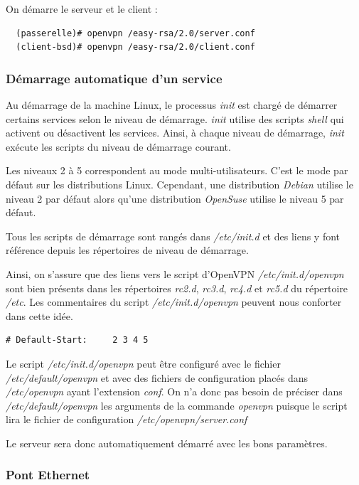 \documentclass[a4paper]{article}
\begin{document}
On démarre le serveur et le client :
\begin{verbatim}
  (passerelle)# openvpn /easy-rsa/2.0/server.conf
  (client-bsd)# openvpn /easy-rsa/2.0/client.conf
\end{verbatim}

\subsubsection{Démarrage automatique d'un service}

Au démarrage de la machine Linux, le processus \textit{init} 
est chargé de démarrer certains services selon le niveau de démarrage.
\textit{init} utilise des scripts \textit{shell} qui activent ou désactivent
les services. Ainsi, à chaque niveau de démarrage, \textit{init} exécute
les scripts du niveau de démarrage courant.

Les niveaux 2 à 5 correspondent au mode multi-utilisateurs. C'est le mode
par défaut sur les distributions Linux. Cependant, une distribution 
\textit{Debian} utilise le niveau 2 par défaut alors qu'une distribution
\textit{OpenSuse} utilise le niveau 5 par défaut.

Tous les scripts de démarrage sont rangés dans \textit{/etc/init.d} et
des liens y font référence depuis les répertoires de niveau de démarrage.

Ainsi, on s'assure que des liens vers le script d'OpenVPN \textit{/etc/init.d/openvpn} 
sont bien présents dans les répertoires \textit{rc2.d}, \textit{rc3.d}, \textit{rc4.d} et
\textit{rc5.d} du répertoire \textit{/etc}.
Les commentaires du script \textit{/etc/init.d/openvpn} peuvent nous conforter dans
cette idée.
\begin{verbatim}
# Default-Start:     2 3 4 5
\end{verbatim}

Le script \textit{/etc/init.d/openvpn} peut être configuré 
avec le fichier \textit{/etc/default/openvpn} et avec des fichiers
de configuration placés dans \textit{/etc/openvpn} ayant l'extension \textit{conf}.
On n'a donc pas besoin de préciser dans \textit{/etc/default/openvpn} les
arguments de la commande \textit{openvpn} puisque le script lira 
le fichier de configuration \textit{/etc/openvpn/server.conf}

Le serveur sera donc automatiquement démarré avec les bons paramètres.

\subsubsection{Pont Ethernet}
\end{document}
